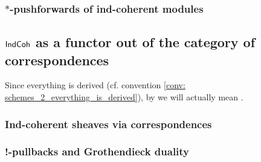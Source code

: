             \subsubsection{\texorpdfstring{$*$}{}-pushforwards of ind-coherent modules}
        
        \subsection{\texorpdfstring{$\mathsf{Ind}\mathsf{Coh}$}{} as a functor out of the category of correspondences}
            \begin{convention}
                Since everything is derived (cf. convention \ref{conv: schemes_2_everything_is_derived}), by  we will actually mean .
            \end{convention}
                
            \subsubsection{Ind-coherent sheaves via correspondences}
        
            \subsubsection{!-pullbacks and Grothendieck duality}